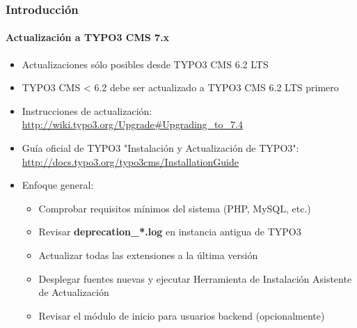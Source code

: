 \begin{frame}[fragile]
	\frametitle{Introducción}
	\framesubtitle{Actualización a TYPO3 CMS 7.x}

	\begin{itemize}
		\item Actualizaciones sólo posibles desde TYPO3 CMS 6.2 LTS
		\item TYPO3 CMS < 6.2 debe ser actualizado a TYPO3 CMS 6.2 LTS primero
	\end{itemize}

	\begin{itemize}

		\item Instrucciones de actualización:\newline
			\smaller\url{http://wiki.typo3.org/Upgrade#Upgrading_to_7.4}\normalsize
		\item Guía oficial de TYPO3 "Instalación y Actualización de TYPO3":
			\smaller\url{http://docs.typo3.org/typo3cms/InstallationGuide}\normalsize
		\item Enfoque general:
			\begin{itemize}
				\item Comprobar requisitos mínimos del sistema \small(PHP, MySQL, etc.)
				\item Revisar \textbf{deprecation\_*.log} en instancia antigua de TYPO3
				\item Actualizar todas las extensiones a la última versión
				\item Desplegar fuentes nuevas y ejecutar Herramienta de Instalación \textrightarrow Asistente de Actualización
				\item Revisar el módulo de inicio para usuarios backend (opcionalmente)
			\end{itemize}
	\end{itemize}

\end{frame}

